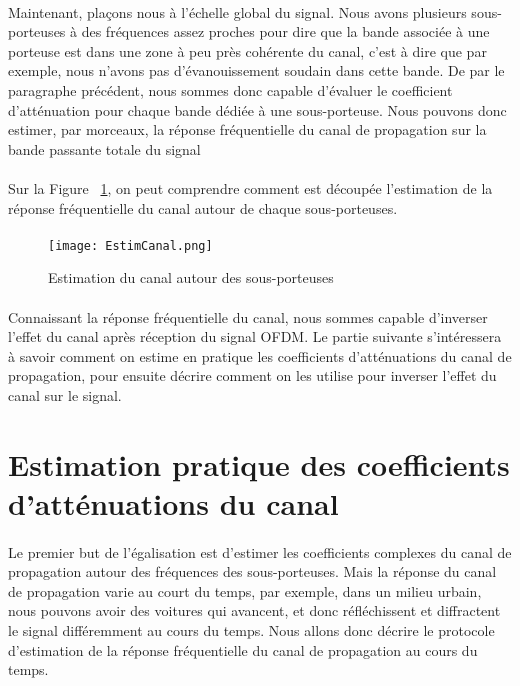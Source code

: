 \paragraph{}
Maintenant, plaçons nous à l'échelle global du signal. Nous avons plusieurs
sous-porteuses à des fréquences assez proches pour dire que la bande associée à
une porteuse est dans une zone à peu près cohérente du canal, c'est à dire que
par exemple, nous n'avons pas d'évanouissement soudain dans cette bande. De par
le paragraphe précédent, nous sommes donc capable d'évaluer le coefficient
d'atténuation pour chaque bande dédiée à une sous-porteuse. Nous pouvons donc
estimer, par morceaux, la réponse fréquentielle du canal de propagation sur la
bande passante totale du signal
\paragraph{}
Sur la Figure ~\ref{EstimPort}, on peut comprendre comment est découpée
l'estimation de la réponse fréquentielle du canal autour de chaque
sous-porteuses.

\paragraph{}
\vspace{1\baselineskip}
\begin{figure}[!h]
  \centering
  \texttt{[image: EstimCanal.png]}
  \caption{Estimation du canal autour des sous-porteuses }
	\label{EstimPort}
\end{figure}

\paragraph{}
Connaissant la réponse fréquentielle du canal, nous sommes capable d'inverser l'effet du canal après réception du signal OFDM. Le partie suivante s'intéressera à savoir comment on estime en pratique les coefficients d'atténuations du canal de propagation, pour ensuite décrire comment on les utilise pour inverser l'effet du canal sur le signal.


\section{Estimation pratique des coefficients d'atténuations du canal}

\paragraph{}
Le premier but de l'égalisation est d'estimer les coefficients complexes du canal de propagation autour des fréquences des sous-porteuses. Mais la réponse du canal de propagation varie au court du temps, par exemple, dans un milieu urbain, nous pouvons avoir des voitures qui avancent, et donc réfléchissent et diffractent le signal différemment au cours du temps. Nous allons donc décrire le protocole d'estimation de la réponse fréquentielle du canal de propagation au cours du temps.

